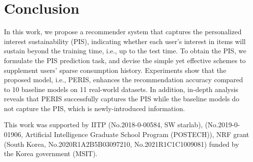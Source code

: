 \documentclass[sigconf]{acmart}
\newcommand{\MD}{{\small\textsf{PERIS}}}
\begin{document}
\section{Conclusion}
In this work, we propose a recommender system that captures the personalized interest sustainability (PIS), indicating whether each user's interest in items will sustain beyond the training time, i.e., up to the test time. To obtain the PIS, we formulate the PIS prediction task, and devise the simple yet effective schemes to supplement users' sparse consumption history. 
Experiments show that the proposed model, i.e., \MD{}, enhances the recommendation accuracy compared to 10 baseline models on 11 real-world datasets. In addition, in-depth analysis reveals that \MD{} successfully captures the PIS while the baseline models do not capture the PIS, which is newly-introduced information. 


\begin{acks}
This work was supported by IITP (No.2018-0-00584, SW starlab), (No.2019-0-01906, Artificial Intelligence Graduate School Program (POSTECH)), NRF grant (South Korea, No.2020R1A2B5B03097210, No.2021R1C1C1009081) funded by the Korea government (MSIT).
\end{acks}





\balance


\newpage
\end{document}
